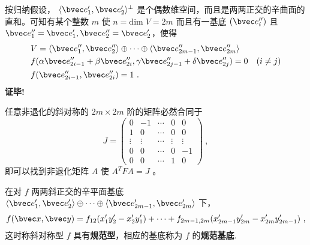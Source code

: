 按归纳假设， $\langle\bvec e'_1,\bvec e'_2\rangle^{\perp}$ 是个偶数维空间，而且是两两正交的辛曲面的直和。可知有某个整数 $m$ 使 $n=\mathrm{dim}\;V=2m$ 而且有一基底 $(\bvec e_i'')$ 且 $\bvec e''_1=\bvec e'_1,\bvec e''_2=\bvec e'_2$，使得
\begin{equation}
 \begin{aligned}
 &V=\langle\bvec e''_1,\bvec e''_2\rangle\oplus\cdots\oplus\langle\bvec e''_{2m-1},\bvec e''_{2m}\rangle\\
&f(\alpha\bvec e''_{2i-1}+\beta\bvec e''_{2i},\gamma\bvec e''_{2j-1}+\delta\bvec e''_{2j})=0\quad (i\neq j)\\
 &f(\bvec e''_{2i-1},\bvec e''_{2i})=1~.
 \end{aligned}
 \end{equation}
 \textbf{证毕!}
 \begin{corollary}{}
 任意非退化的斜对称的 $2m\times2m$ 阶的矩阵必然合同于
 \begin{equation}
 J=\begin{pmatrix}
 0&-1&\cdots&0&0\\
 1&0&\cdots&0&0\\
 \vdots&\vdots&\cdots&\vdots&\vdots\\
 0&0&\cdots&0&-1\\
 0&0&\cdots&1&0
 \end{pmatrix}~,
 \end{equation}
 即可以找到非退化矩阵 $A$ 使 $A^{T}FA=J$ 。
 \end{corollary}
 在对 $f$ 两两斜正交的辛平面基底 $\langle\bvec e'_1,\bvec e'_2\rangle\oplus\cdots\oplus\langle\bvec e'_{2m-1},\bvec e'_{2m}\rangle$ 下，
 \begin{equation}
 f(\bvec x,\bvec y)=f_{12}(x'_1y'_2-x'_2y'_1)+\cdots+f_{2m-1,2m}(x'_{2m-1}y'_{2m}-x'_{2m}y'_{2m-1})~,
 \end{equation}
 这时称斜对称型 $f$ 具有\textbf{规范型}，相应的基底称为 $f$ 的\textbf{规范基底}.